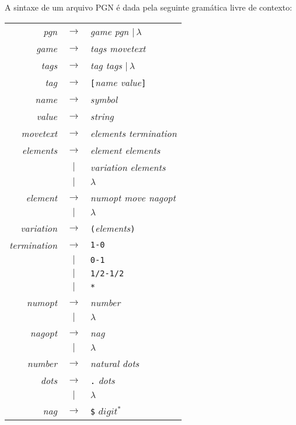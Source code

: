 \documentclass[11pt,a4paper]{article}
\begin{document}
A sintaxe de um arquivo PGN \'e dada pela seguinte gram\'atica livre de contexto:

\begin{tabular}{rcl}
	\textit{pgn} & $\rightarrow$ & \textit{game pgn $|\,\lambda$}\\
	\textit{game} & $\rightarrow$ & \textit{tags movetext}\\
	\textit{tags} & $\rightarrow$ & \textit{tag tags $|\,\lambda$}\\
	\textit{tag} & $\rightarrow$ & \texttt{[}\textit{name value}\texttt{]}\\
	\textit{name} & $\rightarrow$ & \textit{symbol}\\
	\textit{value} & $\rightarrow$ & \textit{string}\\
	\textit{movetext} & $\rightarrow$ & \textit{elements termination}\\
	\textit{elements} & $\rightarrow$ & \textit{element elements}\\
					  & $|$           & \textit{variation elements}\\
					  & $|$           & $\lambda$\\ 
	\textit{element}  & $\rightarrow$ & \textit{numopt move nagopt}\\
	                  & $|$           & $\lambda$\\		
	\textit{variation} & $\rightarrow$ & \texttt{(}\textit{elements}\texttt{)}\\
	\textit{termination} & $\rightarrow$ & \texttt{1-0}\\
						 & $|$           & \texttt{0-1}\\
						 & $|$           & \texttt{1/2-1/2}\\
						 & $|$           & \texttt{*}\\	
	\textit{numopt}       & $\rightarrow$ & \textit{number}\\
						 & $|$           & $\lambda$\\	  
	\textit{nagopt}       & $\rightarrow$ & \textit{nag}\\
	                     & $|$           & $\lambda$\\
	\textit{number}      & $\rightarrow$ & \textit{natural dots}\\
	\textit{dots}        & $\rightarrow$ & \texttt{.} \textit{dots}\\
						 & $|$           & $\lambda$\\
	\textit{nag}         & $\rightarrow$ & \texttt{\$} $digit^{*}$\\
\end{tabular}
\end{document}
